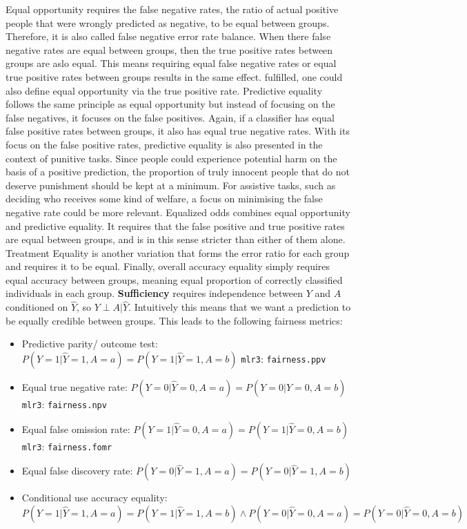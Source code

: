 Equal opportunity requires the false negative rates, the ratio of actual positive people that were wrongly predicted as negative, to be equal between groups.
Therefore, it is also called false negative error rate balance. When there false negative rates are equal between groups, then the true positive rates between groups are aslo equal.
This means requiring equal false negative rates or equal true positive rates between groups results in the same effect.  fulfilled, one could also define equal opportunity via the true positive rate.
Predictive equality follows the same principle as equal opportunity but instead of focusing on the false negatives, it focuses on the false positives. Again, if a classifier has equal false positive rates between groups, it also has equal true negative rates. With its focus on the false positive rates, predictive equality is also presented in the context of punitive tasks. Since people could experience potential harm on the basis of a positive prediction, the proportion of truly innocent people that do not deserve punishment should be kept at a minimum. For assistive tasks, such as deciding who receives some kind of welfare, a focus on minimising the false negative rate could be more relevant. 
Equalized odds combines equal opportunity and predictive equality. It requires that the false positive and true positive rates are equal between groups, and is in this sense stricter than either of them alone. Treatment Equality is another variation that forms the error ratio for each group and requires it to be equal. Finally, overall accuracy equality simply requires equal accuracy between groups, meaning equal proportion of correctly classified individuals in each group.
\textbf{Sufficiency} requires independence between $Y$ and $A$ conditioned on $\hat{Y}$, so $Y \perp A | \hat{Y}$. Intuitively this means that we want a prediction to be equally credible between groups. This leads to the following fairness metrics:

\begin{itemize}
    \item Predictive parity/ outcome test: $P(Y = 1 | \hat{Y} = 1, A = a) = P(Y = 1 | \hat{Y} = 1, A = b)$ \texttt{mlr3}: \texttt{fairness.ppv}
    \item Equal true negative rate: $P(Y = 0 | \hat{Y} = 0, A = a) = P(Y = 0 | \hat{Y} = 0, A = b)$ \texttt{mlr3}: \texttt{fairness.npv}
    \item Equal false omission rate: $P(Y = 1 | \hat{Y} = 0, A = a) = P(Y = 1 | \hat{Y} = 0, A = b)$ \texttt{mlr3}: \texttt{fairness.fomr}
    \item Equal false discovery rate: $P(Y = 0 | \hat{Y} = 1, A = a) = P(Y = 0 | \hat{Y} = 1, A = b)$ 
    \item Conditional use accuracy equality: $P(Y = 1 | \hat{Y} = 1, A = a) = P(Y = 1 | \hat{Y} = 1, A = b) \land P(Y = 0 | \hat{Y} = 0, A = a) = P(Y = 0 | \hat{Y} = 0, A = b)$
\end{itemize}

